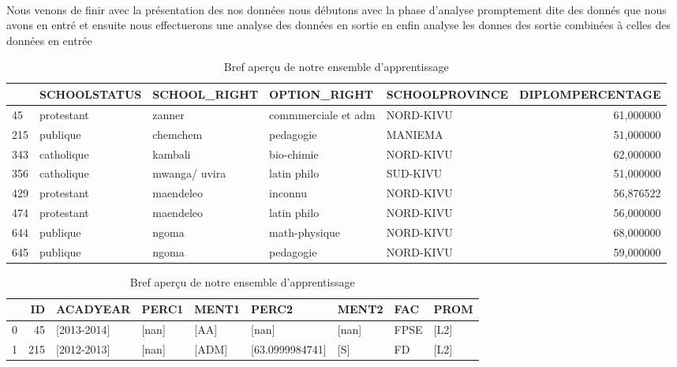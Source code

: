 \paragraph{}
Nous venons de finir avec la présentation des nos données nous débutons avec la phase d'analyse promptement dite  des donnés que nous avons en entré et ensuite nous effectuerons  une analyse des données en
sortie en enfin analyse les donnes des sortie combinées à celles des données  en entrée
\begin{table}
	\centering
	\begingroup %
	\captionsetup{type=table} %
	\caption{Bref aperçu de notre ensemble d'apprentissage }
	\label{tab:Dataset}
	\begin{tabular}{lllllr}
		\toprule
		{} & SCHOOLSTATUS &   SCHOOL\_RIGHT &         OPTION\_RIGHT & SCHOOLPROVINCE &  DIPLOMPERCENTAGE \\
		\midrule
		45  &   protestant &         zanner &  commmerciale et adm &      NORD-KIVU &         61,000000 \\
		215 &     publique &       chemchem &            pedagogie &        MANIEMA &         51,000000 \\
		343 &   catholique &        kambali &           bio-chimie &      NORD-KIVU &         62,000000 \\
		356 &   catholique &  mwanga/ uvira &          latin philo &       SUD-KIVU &         51,000000 \\
		429 &   protestant &      maendeleo &              inconnu &      NORD-KIVU &         56,876522 \\
		474 &   protestant &      maendeleo &          latin philo &      NORD-KIVU &         56,000000 \\
		644 &     publique &          ngoma &        math-physique &      NORD-KIVU &         68,000000 \\
		645 &     publique &          ngoma &            pedagogie &      NORD-KIVU &         59,000000 \\
		\bottomrule
	\end{tabular}
	\begin{tabular}{lrlllllll}
	\toprule
	{} &   ID &                ACADYEAR &                  PERC1 &     MENT1 &                 PERC2 &       MENT2 &   FAC &      PROM \\
	\midrule
	0 &   45 &             [2013-2014] &                  [nan] &      [AA] &                 [nan] &       [nan] &  FPSE &      [L2] \\
	1 &  215 &             [2012-2013] &                  [nan] &     [ADM] &       [63.0999984741] &         [S] &    FD &      [L2] \\

\end{tabular}
\end{table}
